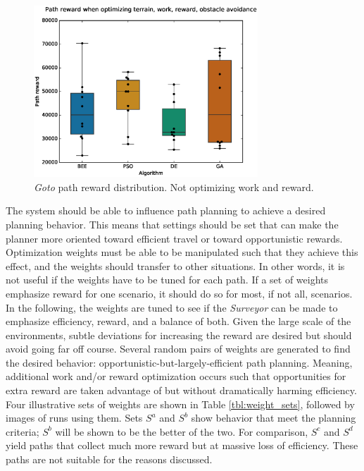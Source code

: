 \documentclass{tamuccthesis}
\begin{document}
\begin{figure}[H]
    \captionsetup{justification=centering}
    \centering
    \includegraphics[width=0.75\textwidth,trim={0cm 0.75cm 0cm 0.75cm},clip]{EXP3_histo_reward_b.eps}
    \caption{\textit{Goto} path reward distribution. Not optimizing work and reward. }
    \label{fig:algcompare_b_reward}
\end{figure}


The system should be able to influence path planning to achieve a desired planning behavior. This means that settings should be set that can make the planner more oriented toward efficient travel or toward opportunistic rewards. Optimization weights must be able to be manipulated such that they achieve this effect, and the weights should transfer to other situations. In other words, it is not useful if the weights have to be tuned for each path. If a set of weights emphasize reward for one scenario, it should do so for most, if not all, scenarios. In the following, the weights are tuned to see if the \textit{Surveyor} can be made to emphasize efficiency, reward, and a balance of both. Given the large scale of the environments, subtle deviations for increasing the reward are desired but should avoid going far off course. Several random pairs of weights are generated to find the desired behavior: opportunistic-but-largely-efficient path planning. Meaning, additional work and/or reward optimization occurs such that opportunities for extra reward are taken advantage of but without dramatically harming efficiency. Four illustrative sets of weights are shown in Table \ref{tbl:weight_sets}, followed by images of runs using them. Sets $S^a$ and $S^b$ show behavior that meet the planning criteria; $S^b$ will be shown to be the better of the two. For comparison, $S^c$ and $S^d$ yield paths that collect much more reward but at massive loss of efficiency. These paths are not suitable for the reasons discussed. 
\end{document}
